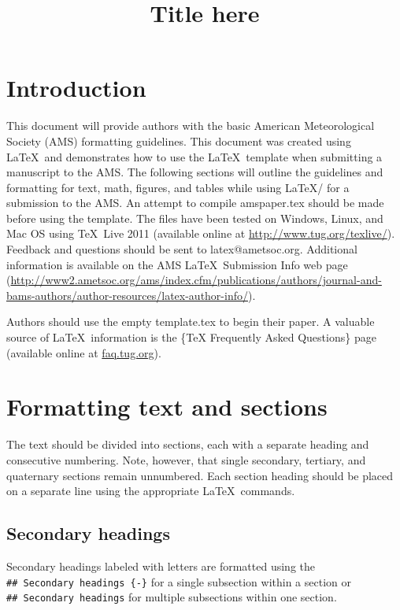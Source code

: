 \documentclass[draft]{ametsoc}
\title{Title here}
\affiliation{American Meteorological Society,Boston, Massachusetts}
\begin{document}
\maketitle
\section{Introduction}\label{introduction}

This document will provide authors with the basic American
Meteorological Society (AMS) formatting guidelines. This document was
created using \LaTeX~and demonstrates how to use the \LaTeX~template
when submitting a manuscript to the AMS. The following sections will
outline the guidelines and formatting for text, math, figures, and
tables while using \LaTeX/ for a submission to the AMS. An attempt to
compile amspaper.tex should be made before using the template. The files
have been tested on Windows, Linux, and Mac OS using \TeX~Live 2011
(available online at \url{http://www.tug.org/texlive/}). Feedback and
questions should be sent to latex@ametsoc.org. Additional information is
available on the AMS \LaTeX~Submission Info web page
(\url{http://www2.ametsoc.org/ams/index.cfm/publications/authors/journal-and-bams-authors/author-resources/latex-author-info/}).

Authors should use the empty template.tex to begin their paper. A
valuable source of \LaTeX~information is the \{TeX Frequently Asked
Questions\} page (available online at \url{faq.tug.org}).

\section{Formatting text and
sections}\label{formatting-text-and-sections}

The text should be divided into sections, each with a separate heading
and consecutive numbering. Note, however, that single secondary,
tertiary, and quaternary sections remain unnumbered. Each section
heading should be placed on a separate line using the appropriate
\LaTeX~commands.

\subsection*{Secondary headings}\label{secondary-headings}

Secondary headings labeled with letters are formatted using the
\texttt{\#\#\ Secondary\ headings\ \{-\}} for a single subsection within
a section or \texttt{\#\#\ Secondary\ headings} for multiple subsections
within one section.
\end{document}
